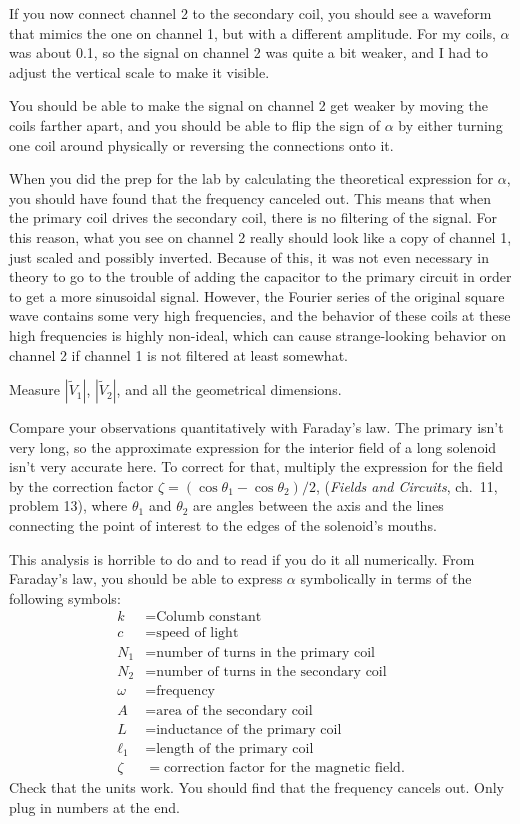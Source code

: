 If you now connect channel 2 to the secondary coil, you should see a waveform
that mimics the one on channel 1, but with a different amplitude. For my coils,
$\alpha$ was about 0.1, so the signal on channel 2 was quite a bit weaker, and I
had to adjust the vertical scale to make it visible.

You should be able to make the signal on channel 2 get weaker by moving the
coils farther apart, and you should be able to flip the sign of $\alpha$
by either turning one coil around physically or reversing the connections
onto it.

When you did the prep for the lab by calculating the theoretical expression for
$\alpha$, you should have found that the frequency canceled out. This means
that when the primary coil drives the secondary coil, there is no filtering
of the signal. For this reason, what you see on channel 2 really should look
like a copy of channel 1, just scaled and possibly inverted. Because of this,
it was not even necessary in theory to go to the trouble of adding the capacitor
to the primary circuit in order to get a more sinusoidal signal. However, the
Fourier series of the original square wave contains some very high frequencies,
and the behavior of these coils at these high frequencies is highly non-ideal,
which can cause strange-looking behavior on channel 2 if channel 1 is not
filtered at least somewhat.

Measure $|\tilde{V}_1|$, $|\tilde{V}_2|$, and all the geometrical dimensions.

\analysis

Compare your observations quantitatively with Faraday's law.
The primary isn't very long, so the approximate expression for the
interior field of a long solenoid isn't very accurate here. To correct
for that, multiply the expression for the field by the correction
factor $\zeta = (\cos\theta_1-\cos\theta_2)/2$,
(\emph{Fields and Circuits}, ch.~11, problem 13), where
$\theta_1$ and $\theta_2$ are angles between the axis and the lines connecting
the point of interest to the edges of the solenoid's mouths.

This analysis is horrible to do and to read if you do it all numerically.
From Faraday's law, you should be able to
express $\alpha$ symbolically in terms of the following
symbols:
\begin{align*}
 k  &= \text{Columb constant} \\
 c  &= \text{speed of light} \\
 N_1  &= \text{number of turns in the primary coil} \\
 N_2  &= \text{number of turns in the secondary coil} \\
 \omega  &= \text{frequency} \\
 A  &= \text{area of the secondary coil} \\
 L  &= \text{inductance of the primary coil} \\
 \ell_1  &= \text{length of the primary coil} \\
 \zeta  &= \text{correction factor for the magnetic field}.
\end{align*}
Check that the units work. You should find that the frequency cancels out.
Only plug in numbers at the end.

